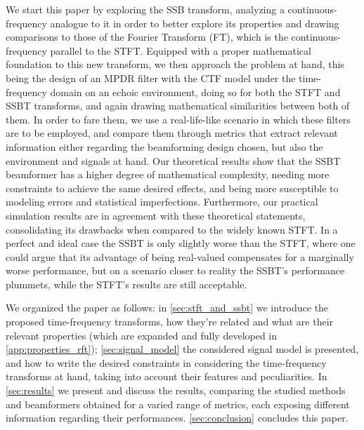 We start this paper by exploring the SSB transform, analyzing a continuous-frequency analogue to it in order to better explore its properties and drawing comparisons to those of the Fourier Transform (FT), which is the continuous-frequency parallel to the STFT. Equipped with a proper mathematical foundation to this new transform, we then approach the problem at hand, this being the design of an MPDR filter with the CTF model under the time-frequency domain on an echoic environment, doing so for both the STFT and SSBT transforms, and again drawing mathematical similarities between both of them. In order to fare them, we use a real-life-like scenario in which these filters are to be employed, and compare them through metrics that extract relevant information either regarding the beamforming design chosen, but also the environment and signals at hand. Our theoretical results show that the SSBT beamformer has a higher degree of mathematical complexity, needing more constraints to achieve the same desired effects, and being more susceptible to modeling errors and statistical imperfections. Furthermore, our practical simulation results are in agreement with these theoretical statements, consolidating its drawbacks when compared to the widely known STFT. In a perfect and ideal case the SSBT is only slightly worse than the STFT, where one could argue that its advantage of being real-valued compensates for a marginally worse performance, but on a scenario closer to reality the SSBT's performance plummets, while the STFT's results are still acceptable.

We organized the paper as follows:
in \cref{sec:stft_and_ssbt} we introduce the proposed time-frequency transforms, how they're related and what are their relevant properties (which are expanded and fully developed in \cref{app:properties_rft});
\cref{sec:signal_model} the considered signal model is presented, and how to write the desired constraints in considering the time-frequency transforms at hand, taking into account their features and peculiarities.
In \cref{sec:results} we present and discuss the results, comparing the studied methods and beamformers obtained for a varied range of metrics, each exposing different information regarding their performances.
\cref{sec:conclusion} concludes this paper.